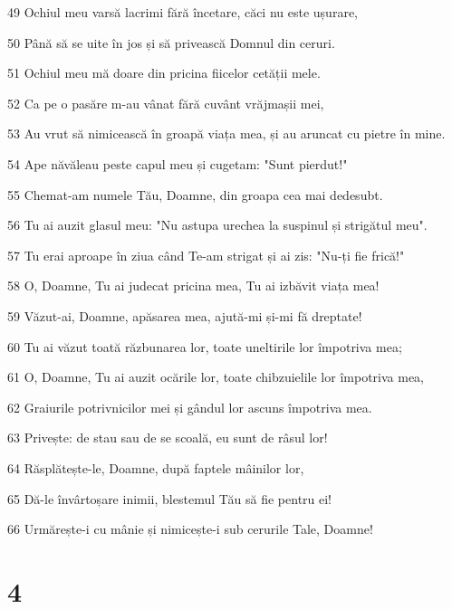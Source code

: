 \par 49 Ochiul meu varsă lacrimi fără încetare, căci nu este ușurare,
\par 50 Până să se uite în jos și să privească Domnul din ceruri.
\par 51 Ochiul meu mă doare din pricina fiicelor cetății mele.
\par 52 Ca pe o pasăre m-au vânat fără cuvânt vrăjmașii mei,
\par 53 Au vrut să nimicească în groapă viața mea, și au aruncat cu pietre în mine.
\par 54 Ape năvăleau peste capul meu și cugetam: "Sunt pierdut!"
\par 55 Chemat-am numele Tău, Doamne, din groapa cea mai dedesubt.
\par 56 Tu ai auzit glasul meu: "Nu astupa urechea la suspinul și strigătul meu".
\par 57 Tu erai aproape în ziua când Te-am strigat și ai zis: "Nu-ți fie frică!"
\par 58 O, Doamne, Tu ai judecat pricina mea, Tu ai izbăvit viața mea!
\par 59 Văzut-ai, Doamne, apăsarea mea, ajută-mi și-mi fă dreptate!
\par 60 Tu ai văzut toată răzbunarea lor, toate uneltirile lor împotriva mea;
\par 61 O, Doamne, Tu ai auzit ocările lor, toate chibzuielile lor împotriva mea,
\par 62 Graiurile potrivnicilor mei și gândul lor ascuns împotriva mea.
\par 63 Privește: de stau sau de se scoală, eu sunt de râsul lor!
\par 64 Răsplătește-le, Doamne, după faptele mâinilor lor,
\par 65 Dă-le învârtoșare inimii, blestemul Tău să fie pentru ei!
\par 66 Urmărește-i cu mânie și nimicește-i sub cerurile Tale, Doamne!

\chapter{4}

